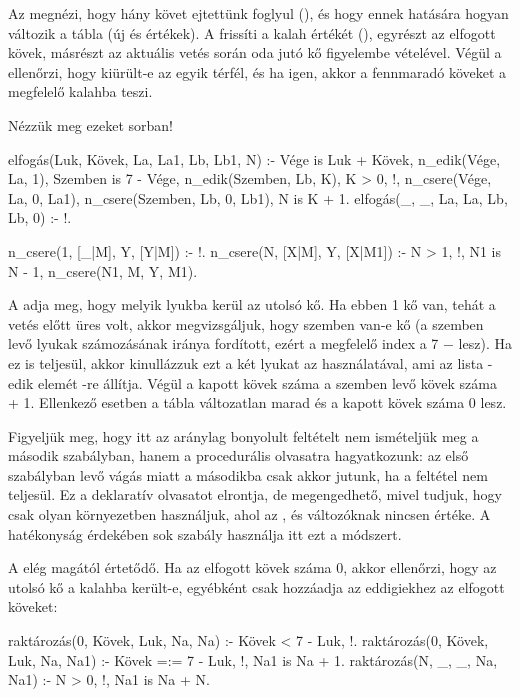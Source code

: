 Az  megnézi, hogy hány követ ejtettünk
foglyul (), és hogy ennek hatására hogyan
változik a tábla (új  és 
értékek). A  frissíti a kalah értékét
(), egyrészt az elfogott kövek, másrészt az
aktuális vetés során oda jutó kő figyelembe
vételével. Végül a  ellenőrzi, hogy
kiürült-e az egyik térfél, és ha igen, akkor a
fennmaradó köveket a megfelelő kalahba teszi.

Nézzük meg ezeket sorban!
\begin{program}
elfogás(Luk, Kövek, La, La1, Lb, Lb1, N) :-
    Vége is Luk + Kövek,
    n_edik(Vége, La, 1),
    Szemben is 7 - Vége,
    n_edik(Szemben, Lb, K),
    K > 0, !, %
    n_csere(Vége, La, 0, La1),
    n_csere(Szemben, Lb, 0, Lb1),
    N is K + 1.
elfogás(_, _, La, La, Lb, Lb, 0) :- !.

n_csere(1, [_|M], Y, [Y|M]) :- !.
n_csere(N, [X|M], Y, [X|M1]) :-
    N > 1, !, N1 is N - 1,
    n_csere(N1, M, Y, M1).
\end{program}
A  adja meg, hogy melyik lyukba kerül az
utolsó kő. Ha ebben 1 kő van, tehát a vetés előtt
üres volt, akkor megvizsgáljuk, hogy szemben van-e
kő (a szemben levő lyukak számozásának iránya
fordított, ezért a megfelelő index a 7 $-$ 
lesz). Ha ez is teljesül, akkor kinullázzuk ezt a
két lyukat az 
használatával, ami az  lista -edik
elemét -re állítja. Végül a kapott kövek száma
a szemben levő kövek száma + 1. Ellenkező esetben a
tábla változatlan marad és a kapott kövek száma 0
lesz.

Figyeljük meg, hogy itt az aránylag bonyolult
feltételt nem ismételjük meg a második szabályban,
hanem a procedurális olvasatra hagyatkozunk: az első
szabályban levő vágás miatt a másodikba csak akkor
jutunk, ha a feltétel nem teljesül. Ez a deklaratív
olvasatot elrontja, de megengedhető, mivel tudjuk,
hogy csak olyan környezetben használjuk, ahol az
,  és  változóknak nincsen
értéke. A hatékonyság érdekében sok szabály
használja itt ezt a módszert.

A  elég magától értetődő. Ha az
elfogott kövek száma 0, akkor ellenőrzi, hogy az
utolsó kő a kalahba került-e, egyébként csak
hozzáadja az eddigiekhez az elfogott köveket:
\begin{program}
raktározás(0, Kövek, Luk, Na, Na) :-
    Kövek < 7 - Luk, !.
raktározás(0, Kövek, Luk, Na, Na1) :-
    Kövek =:= 7 - Luk, !, Na1 is Na + 1.
raktározás(N, _, _, Na, Na1) :-
    N > 0, !, Na1 is Na + N.
\end{program}

